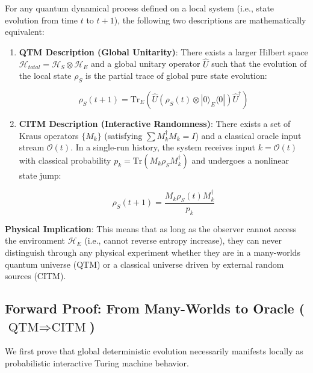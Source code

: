 \begin{theorem}
For any quantum dynamical process defined on a local system (i.e., state evolution from time $t$ to $t+1$), the following two descriptions are mathematically equivalent:

\begin{enumerate}
\item \textbf{QTM Description (Global Unitarity)}: There exists a larger Hilbert space $\mathcal{H}_{total} = \mathcal{H}_S \otimes \mathcal{H}_E$ and a global unitary operator $\hat{U}$ such that the evolution of the local state $\rho_S$ is the partial trace of global pure state evolution:

\begin{equation}
\rho_S(t+1) = \text{Tr}_E \left( \hat{U} (\rho_S(t) \otimes |0\rangle_E \langle 0|) \hat{U}^\dagger \right)
\end{equation}

\item \textbf{CITM Description (Interactive Randomness)}: There exists a set of Kraus operators $\{M_k\}$ (satisfying $\sum M_k^\dagger M_k = I$) and a classical oracle input stream $\mathcal{O}(t)$. In a single-run history, the system receives input $k = \mathcal{O}(t)$ with classical probability $p_k = \text{Tr}(M_k \rho_S M_k^\dagger)$ and undergoes a nonlinear state jump:

\begin{equation}
\rho_S(t+1) = \frac{M_k \rho_S(t) M_k^\dagger}{p_k}
\end{equation}
\end{enumerate}
\end{theorem}

\textbf{Physical Implication}: This means that as long as the observer cannot access the environment $\mathcal{H}_E$ (i.e., cannot reverse entropy increase), they can never distinguish through any physical experiment whether they are in a many-worlds quantum universe (QTM) or a classical universe driven by external random sources (CITM).

\subsection{Forward Proof: From Many-Worlds to Oracle ($\text{QTM} \Rightarrow \text{CITM}$)}

We first prove that global deterministic evolution necessarily manifests locally as probabilistic interactive Turing machine behavior.

